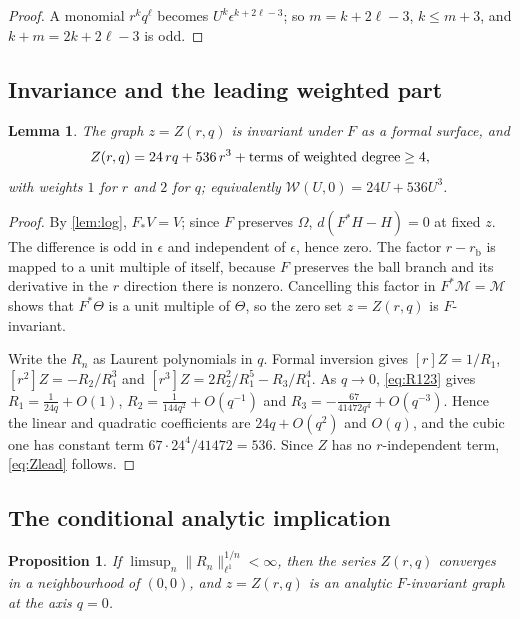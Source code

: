\documentclass[11pt]{amsart}
\numberwithin{equation}{section}
\newtheorem{proposition}[theorem]{Proposition}
\newtheorem{lemma}[theorem]{Lemma}
\theoremstyle{definition}
\theoremstyle{remark}
\newcommand{\norm}[1]{\lVert #1\rVert}
\newcommand{\rb}{r_{\mathrm b}}
\begin{document}
\begin{proof}
A monomial $r^kq^\ell$ becomes $U^k\epsilon^{k+2\ell-3}$; so $m=k+2\ell-3$, $k\le m+3$, and $k+m=2k+2\ell-3$ is odd.
\end{proof}

\subsection{Invariance and the leading weighted part}

\begin{lemma}\label{lem:lead}
The graph $z=Z(r,q)$ is invariant under $F$ as a formal surface, and
\begin{equation}\label{eq:Zlead}
Z(r,q)=24\,rq+536\,r^3+\text{\rm terms of weighted degree}\ge4,
\end{equation}
with weights $1$ for $r$ and $2$ for $q$; equivalently $\mathcal W(U,0)=24U+536U^3$.
\end{lemma}

\begin{proof}
By \cref{lem:log}, $F_*V=V$; since $F$ preserves $\Omega$, $d(F^*H-H)=0$ at fixed $z$. The difference is odd in $\epsilon$ and independent of $\epsilon$, hence zero. The factor $r-\rb$ is mapped to a unit multiple of itself, because $F$ preserves the ball branch and its derivative in the $r$ direction there is nonzero. Cancelling this factor in $F^*\mathcal M=\mathcal M$ shows that $F^*\Theta$ is a unit multiple of $\Theta$, so the zero set $z=Z(r,q)$ is $F$-invariant.

Write the $R_n$ as Laurent polynomials in $q$. Formal inversion gives $[r]Z=1/R_1$, $[r^2]Z=-R_2/R_1^3$ and $[r^3]Z=2R_2^2/R_1^5-R_3/R_1^4$. As $q\to0$, \eqref{eq:R123} gives $R_1=\frac1{24q}+O(1)$, $R_2=\frac1{144q^2}+O(q^{-1})$ and $R_3=-\frac{67}{41472q^4}+O(q^{-3})$. Hence the linear and quadratic coefficients are $24q+O(q^2)$ and $O(q)$, and the cubic one has constant term $67\cdot24^4/41472=536$. Since $Z$ has no $r$-independent term, \eqref{eq:Zlead} follows.
\end{proof}

\subsection{The conditional analytic implication}

\begin{proposition}\label{prop:cond}
If $\limsup_n\norm{R_n}_{\ell^1}^{1/n}<\infty$, then the series $Z(r,q)$ converges in a neighbourhood of $(0,0)$, and $z=Z(r,q)$ is an analytic $F$-invariant graph at the axis $q=0$.
\end{proposition}
\end{document}
